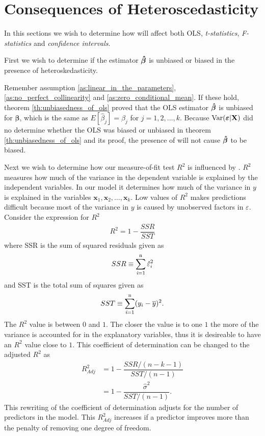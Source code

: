 \newpage
\section{Consequences of Heteroscedasticity}\label{sec:consequence_of_hetero}
In this sections we wish to determine how \hetero will affect both OLS, \textit{t-statistics}, \textit{F-statistics} and \textit{confidence intervals}. 

First we wish to determine if the estimator $\operatorname{\boldsymbol{\hat{\beta}}}$ is unbiased or biased in the presence of heteroskedasticity.  

Remember assumption \ref{as:linear_in_the_parameters}, \ref{as:no_perfect_collinearity} and \ref{as:zero_conditional_mean}. If these hold, theorem \ref{th:unbiasedness_of_ols} proved that the OLS estimator $\operatorname{\boldsymbol{\hat{\beta}}}$ is unbiased for $\boldsymbol{\beta}$, which is the same as $E[\hat{\beta}_j] = \beta_j
$ for $j = 1,2, \ldots, k$. 
Because $\operatorname{\text{Var}}(\boldsymbol{\varepsilon} | \mathbf{X})$ did no determine whether the OLS was biased or unbiased in theorem \ref{th:unbiasedness_of_ols} and its proof, the presence of \hetero will not cause $\operatorname{\boldsymbol{\hat{\beta}}}$ to be biased. 

Next we wish to determine how our measure-of-fit test $R^2$ is influenced by \hetero. 
$R^2$ measures how much of the variance in the dependent variable is explained by the independent variables. In our model it determines how much of the variance in $y$ is explained in the variables $\mathbf{x}_1, \mathbf{x}_2, \ldots, \mathbf{x}_k$. 
Low values of $R^2$ makes predictions difficult because most of the variance in $y$ is caused by unobserved factors in $\varepsilon$.
Consider the expression for $R^2$
\begin{align*}
    R^2 = 1 - \dfrac{SSR}{SST}
\end{align*}
where SSR is the sum of squared residuals given as
\begin{align*}
    SSR \equiv \operatorname{\sum_{\textit{i}=1}^n} \hat{\varepsilon}_i^2
\end{align*}
and SST is the total sum of squares given as
\begin{align*}
    SST \equiv \operatorname{\sum_{\textit{i}=1}^n} (y_i - \overline{y})^2. 
\end{align*}
The $R^2$ value is between $0$ and $1$. The closer the value is to one $1$ the more of the variance is accounted for in the explanatory variables, thus it is desireable to have an $R^2$ value close to $1$.
This coefficient of determination can be changed to the adjusted $R^2$ as
\begin{align*}
    R^2_{Adj} &= 1 - \dfrac{SSR/(n - k - 1)}{SST/(n - 1)}\\
      &= 1 - \dfrac{\hat{\sigma}^2}{SST/(n-1)}.
\end{align*}
This rewriting of the coefficient of determination adjusts for the number of predictors in the model. This $R^2_{Adj}$ increases if a predictor improves more than the penalty of removing one degree of freedom. 

